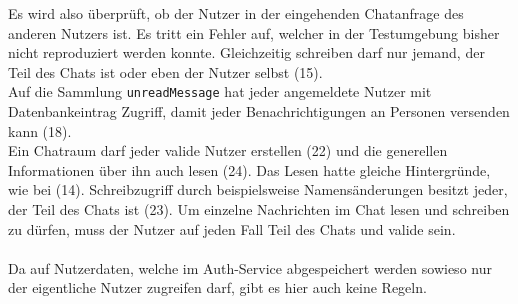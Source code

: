 Es wird also überprüft, ob der Nutzer in der eingehenden Chatanfrage des anderen Nutzers ist.
Es tritt ein Fehler auf, welcher in der Testumgebung bisher nicht reproduziert werden konnte.
Gleichzeitig schreiben darf nur jemand, der Teil des Chats ist oder eben der Nutzer selbst (15).\\
Auf die Sammlung \texttt{unreadMessage} hat jeder angemeldete Nutzer mit Datenbankeintrag Zugriff, damit jeder Benachrichtigungen an Personen versenden kann (18).\\
Ein Chatraum darf jeder valide Nutzer erstellen (22) und die generellen Informationen über ihn auch lesen (24).
Das Lesen hatte gleiche Hintergründe, wie bei (14).
Schreibzugriff durch beispielsweise Namensänderungen besitzt jeder, der Teil des Chats ist (23).
Um einzelne Nachrichten im Chat lesen und schreiben zu dürfen, muss der Nutzer auf jeden Fall Teil des Chats und valide sein.\\
\\
Da auf Nutzerdaten, welche im Auth-Service abgespeichert werden sowieso nur der eigentliche Nutzer zugreifen darf, gibt es hier auch keine Regeln.

